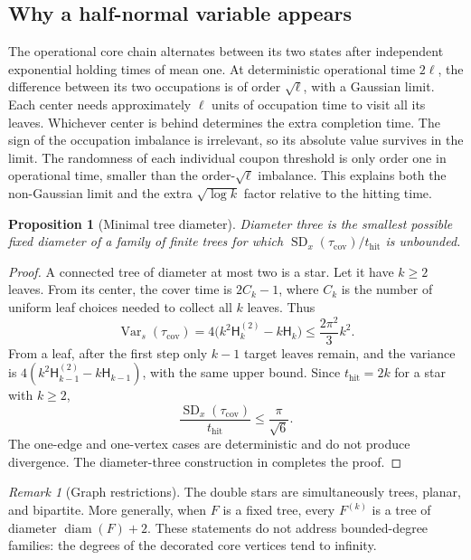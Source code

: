 \documentclass[11pt]{amsart}
\newtheorem{proposition}[theorem]{Proposition}
\theoremstyle{remark}
\newtheorem{remark}[theorem]{Remark}
\numberwithin{equation}{section}
\DeclareMathOperator{\Var}{Var}
\DeclareMathOperator{\SD}{SD}
\newcommand{\thit}{t_{\mathrm{hit}}}
\newcommand{\taucov}{\tau_{\mathrm{cov}}}
\newcommand{\Harm}{\mathsf{H}}
\begin{document}
\subsection{Why a half-normal variable appears}
The operational core chain alternates between its two states after independent exponential holding times of mean one. At deterministic operational time $2\ell$, the difference between its two occupations is of order $\sqrt\ell$, with a Gaussian limit. Each center needs approximately $\ell$ units of occupation time to visit all its leaves. Whichever center is behind determines the extra completion time. The sign of the occupation imbalance is irrelevant, so its absolute value survives in the limit. The randomness of each individual coupon threshold is only order one in operational time, smaller than the order-$\sqrt\ell$ imbalance. This explains both the non-Gaussian limit and the extra $\sqrt{\log k}$ factor relative to the hitting time.

\begin{proposition}[Minimal tree diameter]\label{prop:diameter}
Diameter three is the smallest possible fixed diameter of a family of finite trees for which $\SD_x(\taucov)/\thit$ is unbounded.
\end{proposition}

\begin{proof}
A connected tree of diameter at most two is a star. Let it have $k\ge 2$ leaves. From its center, the cover time is $2C_k-1$, where $C_k$ is the number of uniform leaf choices needed to collect all $k$ leaves. Thus
\[
\Var_s(\taucov)=4\big(k^2\Harm^{(2)}_k-k\Harm_k\big)\le\frac{2\pi^2}{3}k^2.
\]
From a leaf, after the first step only $k-1$ target leaves remain, and the variance is $4(k^2\Harm^{(2)}_{k-1}-k\Harm_{k-1})$, with the same upper bound. Since $\thit=2k$ for a star with $k\ge 2$,
\[
\frac{\SD_x(\taucov)}{\thit}\le\frac{\pi}{\sqrt6}.
\]
The one-edge and one-vertex cases are deterministic and do not produce divergence. The diameter-three construction in  completes the proof.
\end{proof}

\begin{remark}[Graph restrictions]\label{rem:restrictions}
The double stars are simultaneously trees, planar, and bipartite. More generally, when $F$ is a fixed tree, every $F^{(k)}$ is a tree of diameter $\operatorname{diam}(F)+2$. These statements do not address bounded-degree families: the degrees of the decorated core vertices tend to infinity.
\end{remark}
\end{document}
